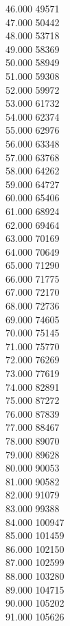 { 46.000	49571 \\
 47.000	50442 \\
 48.000	53718 \\
 49.000	58369 \\
 50.000	58949 \\
 51.000	59308 \\
 52.000	59972 \\
 53.000	61732 \\
 54.000	62374 \\
 55.000	62976 \\
 56.000	63348 \\
 57.000	63768 \\
 58.000	64262 \\
 59.000	64727 \\
 60.000	65406 \\
 61.000	68924 \\
 62.000	69464 \\
 63.000	70169 \\
 64.000	70649 \\
 65.000	71290 \\
 66.000	71775 \\
 67.000	72170 \\
 68.000	72736 \\
 69.000	74605 \\
 70.000	75145 \\
 71.000	75770 \\
 72.000	76269 \\
 73.000	77619 \\
 74.000	82891 \\
 75.000	87272 \\
 76.000	87839 \\
 77.000	88467 \\
 78.000	89070 \\
 79.000	89628 \\
 80.000	90053 \\
 81.000	90582 \\
 82.000	91079 \\
 83.000	99388 \\
 84.000	100947 \\
 85.000	101459 \\
 86.000	102150 \\
 87.000	102599 \\
 88.000	103280 \\
 89.000	104715 \\
 90.000	105202 \\
 91.000	105626 \\
}
